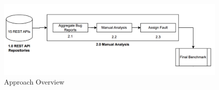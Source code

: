 \documentclass[conference]{IEEEtran}
\begin{document}


\begin{figure}[t] 
    \centering
    \includegraphics[width=1.0\textwidth]{FaultTaxonomyFlow.png}
    \caption{Approach Overview}
    \label{fig:widefigure}
  \end{figure}
\end{document}
